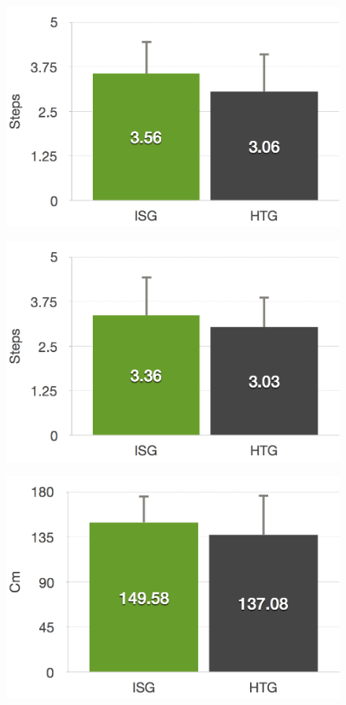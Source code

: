 \begin{figure}[htb]
\begin{minipage}[t]{0.40\linewidth}
		\includegraphics[width=1\linewidth]{Pictures/6_4_DIA_StepsLeftGroupEffect}
		\label{fig:6_4_stepsLeftGroupEffect}
	\end{minipage}
	\hfill
	\begin{minipage}[t]{0.40\linewidth}
		\centering
		\includegraphics[width=1\linewidth]{Pictures/6_4_DIA_StepsRightGroupEffect}
		\label{fig:6_4_stepsRightGroupEffect}
	\end{minipage}
	\hfill
	\begin{minipage}[t]{0.40\linewidth}
		\centering
		\includegraphics[width=1\linewidth]{Pictures/6_4_DIA_DistanceLeftGroupEffect}

\end{minipage}
\end{figure}
